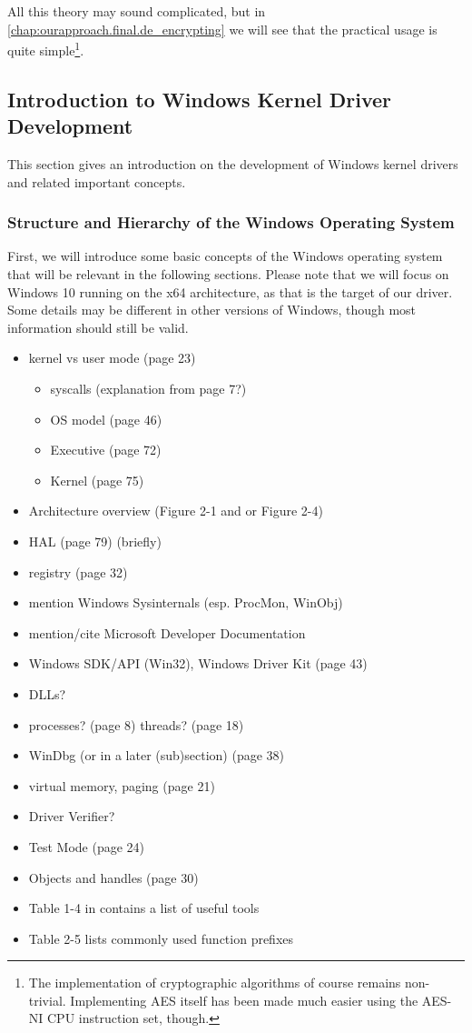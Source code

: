 All this theory may sound complicated, but in \autoref{chap:ourapproach.final.de_encrypting} we will see that the practical usage is quite simple\footnote{\label{fn:background.luks2.simplecryptography} The implementation of cryptographic algorithms of course remains non-trivial. Implementing AES itself has been made much easier using the AES-NI CPU instruction set, though.}.

\subsection{Introduction to Windows Kernel Driver Development}
\label{chap:background.kerneldriver}
This section gives an introduction on the development of Windows kernel drivers and related important concepts.

\subsubsection{Structure and Hierarchy of the Windows Operating System}
\label{chap:background.kerneldriver.oshierarchy}
First, we will introduce some basic concepts of the Windows operating system that will be relevant in the following sections. Please note that we will focus on Windows 10 running on the x64 architecture, as that is the target of our driver. Some details may be different in other versions of Windows, though most information should still be valid.

\begin{itemize}
	\item kernel vs user mode (page 23)
	\begin{itemize}
		\item syscalls (explanation from page 7?)
		\item OS model (page 46)
		\item Executive (page 72)
		\item Kernel (page 75)
	\end{itemize}
	\item Architecture overview (Figure 2-1 and or Figure 2-4)
	\item HAL (page 79) (briefly)
	\item registry (page 32)
	\item mention Windows Sysinternals (esp. ProcMon, WinObj)
	\item mention/cite Microsoft Developer Documentation
	\item Windows SDK/API (Win32), Windows Driver Kit (page 43)
	\item DLLs?
	\item processes? (page 8) threads? (page 18)
	\item WinDbg (or in a later (sub)section) (page 38)
	\item virtual memory, paging (page 21)
	\item Driver Verifier?
	\item Test Mode (page 24)
	\item Objects and handles (page 30)
	\item Table 1-4 in \cite{Yosifovich2017} contains a list of useful tools
	\item Table 2-5  lists commonly used function prefixes
\end{itemize}

